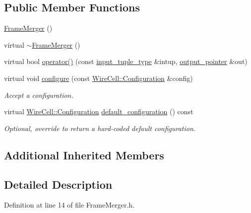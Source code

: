 \subsection*{Public Member Functions}
\begin{DoxyCompactItemize}
\item 
\hyperlink{class_wire_cell_1_1_sig_proc_1_1_frame_merger_ac9a4b861a35c0fdf3a4f988591b67681}{Frame\+Merger} ()
\item 
virtual \hyperlink{class_wire_cell_1_1_sig_proc_1_1_frame_merger_a75e93a096abb129e9b7eba64b536d926}{$\sim$\+Frame\+Merger} ()
\item 
virtual bool \hyperlink{class_wire_cell_1_1_sig_proc_1_1_frame_merger_a8869c4f2709ada2d63c9a5bec95cbc5f}{operator()} (const \hyperlink{class_wire_cell_1_1_i_join_node_ae9ca74a75f29555ad20944d585f3b232}{input\+\_\+tuple\+\_\+type} \&intup, \hyperlink{class_wire_cell_1_1_i_join_node_a7af33cc87415e15f0e7db2b083f3def7}{output\+\_\+pointer} \&out)
\item 
virtual void \hyperlink{class_wire_cell_1_1_sig_proc_1_1_frame_merger_ab66b033b43d0c85f8ecf4ebfe77ff728}{configure} (const \hyperlink{namespace_wire_cell_a9f705541fc1d46c608b3d32c182333ee}{Wire\+Cell\+::\+Configuration} \&config)
\begin{DoxyCompactList}\small\item\em Accept a configuration. \end{DoxyCompactList}\item 
virtual \hyperlink{namespace_wire_cell_a9f705541fc1d46c608b3d32c182333ee}{Wire\+Cell\+::\+Configuration} \hyperlink{class_wire_cell_1_1_sig_proc_1_1_frame_merger_a338f9c397a378eeae1ae2ac93cfca07d}{default\+\_\+configuration} () const
\begin{DoxyCompactList}\small\item\em Optional, override to return a hard-\/coded default configuration. \end{DoxyCompactList}\end{DoxyCompactItemize}
\subsection*{Additional Inherited Members}


\subsection{Detailed Description}


Definition at line 14 of file Frame\+Merger.\+h.



